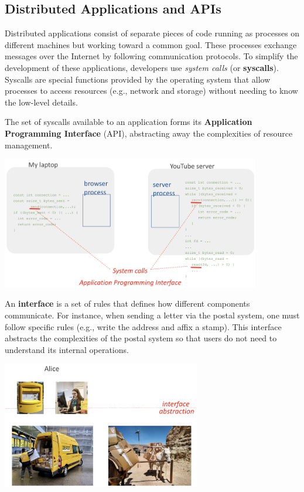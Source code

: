 \subsection{Distributed Applications and APIs}

Distributed applications consist of separate pieces of code running as processes on different machines but working toward a common goal. These processes exchange messages over the Internet by following communication protocols.  
To simplify the development of these applications, developers use \emph{system calls} (or \textbf{syscalls}). Syscalls are special functions provided by the operating system that allow processes to access resources (e.g., network and storage) without needing to know the low-level details.

The set of syscalls available to an application forms its \textbf{Application Programming Interface} (API), abstracting away the complexities of resource management.

\begin{center}
  \includegraphics[width=0.85\textwidth]{chapters/L1/images/api.png}
\end{center}

\vfill
\begin{definition}[Interface]
An \textbf{interface} is a set of rules that defines how different components communicate. For instance, when sending a letter via the postal system, one must follow specific rules (e.g., write the address and affix a stamp). This interface abstracts the complexities of the postal system so that users do not need to understand its internal operations.
\end{definition}

\begin{center}
  \includegraphics[width=0.65\textwidth]{chapters/L1/images/postal.png}
\end{center}
\vfill
